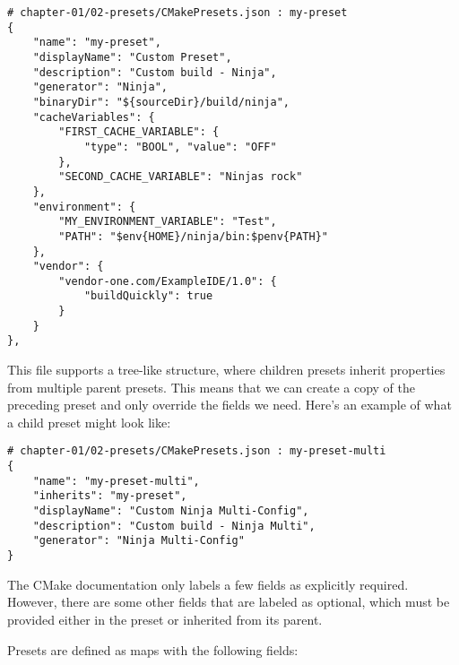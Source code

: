 \begin{lstlisting}[style=styleCMake]
# chapter-01/02-presets/CMakePresets.json : my-preset
{
	"name": "my-preset",
	"displayName": "Custom Preset",
	"description": "Custom build - Ninja",
	"generator": "Ninja",
	"binaryDir": "${sourceDir}/build/ninja",
	"cacheVariables": {
		"FIRST_CACHE_VARIABLE": {
			"type": "BOOL", "value": "OFF"
		},
		"SECOND_CACHE_VARIABLE": "Ninjas rock"
	},
	"environment": {
		"MY_ENVIRONMENT_VARIABLE": "Test",
		"PATH": "$env{HOME}/ninja/bin:$penv{PATH}"
	},
	"vendor": {
		"vendor-one.com/ExampleIDE/1.0": {
			"buildQuickly": true
		}
	}
},
\end{lstlisting}

This file supports a tree-like structure, where children presets inherit properties from multiple parent presets. This means that we can create a copy of the preceding preset and only override the fields we need. Here's an example of what a child preset might look like:

\begin{lstlisting}[style=styleCMake]
# chapter-01/02-presets/CMakePresets.json : my-preset-multi
{
	"name": "my-preset-multi",
	"inherits": "my-preset",
	"displayName": "Custom Ninja Multi-Config",
	"description": "Custom build - Ninja Multi",
	"generator": "Ninja Multi-Config"
}
\end{lstlisting}

\begin{tcolorbox}[colback=blue!5!white,colframe=blue!75!black,title=Note]
The CMake documentation only labels a few fields as explicitly required. However, there are some other fields that are labeled as optional, which must be provided either in the preset or inherited from its parent.
\end{tcolorbox}

Presets are defined as maps with the following fields:

